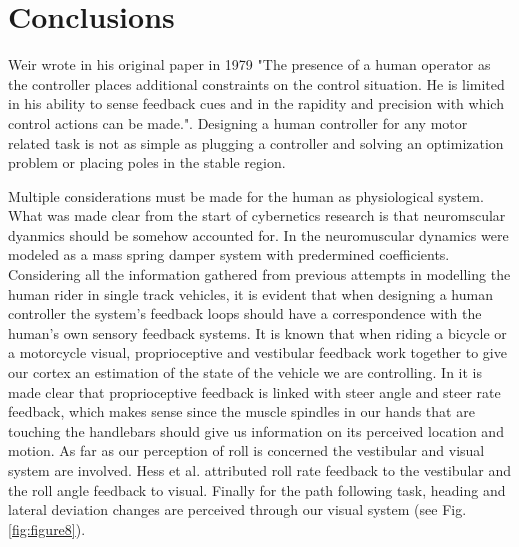 \chapter{Conclusions}
\label{conclusions}

Weir wrote in his original paper in 1979 "The presence of a human operator as the controller places additional constraints on the control situation. He is limited in his ability to sense feedback cues and in the rapidity and precision with which control actions can be made.". Designing a human controller for any motor related task is not as simple as plugging a controller and solving an optimization problem or placing poles in the stable region. 
\par
Multiple considerations must be made for the human as physiological system. What was made clear from the start of cybernetics research is that neuromscular dyanmics should be somehow accounted for. In \cite{hess2012modeling,schwab2013,moore2012human} the neuromuscular dynamics were modeled as a mass spring damper system with predermined coefficients. Considering all the information gathered from previous attempts in modelling the human rider in single track vehicles, it is evident that when designing a human controller the system's feedback loops should have a correspondence with the human's own sensory feedback systems. It is known that when riding a bicycle or a motorcycle visual, proprioceptive  and vestibular feedback work together to give our cortex an estimation of the state of the vehicle we are controlling. In  \cite{hess2012modeling,schwab2013,moore2012human} it is made clear that proprioceptive feedback is linked with steer angle and steer rate feedback, which makes sense since the muscle spindles in our hands that are touching the handlebars should give us information on its perceived location and motion. As far as our perception of roll is concerned the vestibular and visual system  are involved. Hess et al.\cite{hess2012modeling} attributed roll rate feedback to the vestibular and the roll angle feedback to visual. Finally for the path following task, heading and lateral deviation changes are perceived  through our visual system (see Fig. \ref{fig:figure8}).

